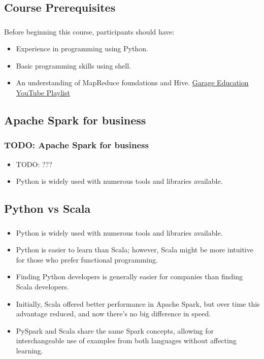 \subsection{Course Prerequisites}
\begin{frame}
    \frametitle{\subsecname}
    Before beginning this course, participants should have:
    \begin{itemize}
        \item Experience in programming using Python.  \pause
        \item Basic programming skills using shell.  \pause
        \item An understanding of MapReduce foundations and Hive. \href{https://www.youtube.com/playlist?list=PLxNoJq6k39G8Ak39PDC-oYvp6ZRvIn3Pa}{Garage Education YouTube Playlist}  \pause
    \end{itemize}

\end{frame}


\subsection{Apache Spark for business}\label{subsec:spark-for-non-technical}
\begin{frame}
    \frametitle{TODO: Apache Spark for business}
    \begin{itemize}
        \item TODO: ???
        \item Python is widely used with numerous tools and libraries available. \pause
    \end{itemize}
\end{frame}

\subsection{Python vs Scala}\label{subsec:python-vs-scala}
\begin{frame}
    \frametitle{\subsecname}
    \begin{itemize}
        \item Python is widely used with numerous tools and libraries available. \pause
        \item Python is easier to learn than Scala; however, Scala might be more intuitive for those who prefer functional programming. \pause
        \item Finding Python developers is generally easier for companies than finding Scala developers. \pause
        \item Initially, Scala offered better performance in Apache Spark, but over time this advantage reduced, and now there's no big difference in speed. \pause
        \item PySpark and Scala share the same Spark concepts, allowing for interchangeable use of examples from both languages without affecting learning. \pause
    \end{itemize}
\end{frame}

